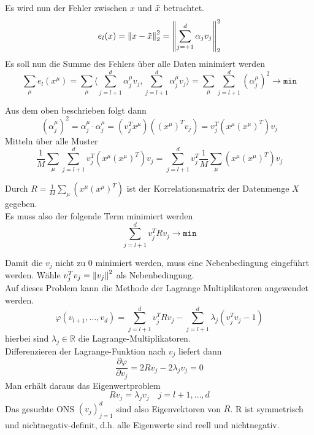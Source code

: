 Es wird nun der Fehler zwischen $x$ und $\Tilde{x}$ betrachtet.
\begin{equation*}
    e_l(x)=\left\lVert x-\Tilde{x}\right\rVert_2^2 = \left\lVert\sum_{j=+1}^d\alpha_jv_j\right\rVert_2^2
\end{equation*}
Es soll nun die Summe des Fehlers über alle Daten minimiert werden
\begin{equation*}
    \sum_\mu e_l(x^\mu) = \sum_\mu \langle \sum_{j=l+1}^d\alpha_j^\mu v_j, \sum_{j=l+1}^d\alpha_j^\mu v_j \rangle = \sum_\mu \sum_{j=l+1}^d(\alpha_j^\mu)^2 \rightarrow \texttt{min}
\end{equation*}

Aus dem oben beschrieben folgt dann
\begin{equation*}
    (\alpha_j^\mu)^2 = \alpha_j^\mu \cdot \alpha_j^\mu = (v_j^Tx^\mu)((x^\mu)^Tv_j) = v_j^T(x^\mu(x^\mu)^T)v_j
\end{equation*}
Mitteln über alle Muster
\begin{equation*}
    \frac{1}{M}\sum_\mu\sum_{j=l+1}^dv_j^T(x^\mu(x^\mu)^T)v_j = \sum_{j=l+1}^dv_j^T\frac{1}{M}\sum_\mu(x^\mu(x^\mu)^T)v_j
\end{equation*}

Durch $R=\frac{1}{M}\sum_\mu(x^\mu(x^\mu)^T)$ ist der Korrelationsmatrix der Datenmenge $X$ gegeben.\\
Es muss also der folgende Term minimiert werden
\begin{equation*}
    \sum_{j=l+1}^dv_j^TRv_j \rightarrow \texttt{min}
\end{equation*}

Damit die $v_j$ nicht zu 0 minimiert werden, muss eine Nebenbedingung eingeführt werden. Wähle $v_j^Tv_j = \left\lVert v_j\right\rVert^2$ als Nebenbedingung.\\
Auf dieses Problem kann die Methode der Lagrange Multiplikatoren angewendet werden.
\begin{equation*}
    \varphi(v_{l+1},\dots,v_d) = \sum_{j=l+1}^dv_j^TRv_j - \sum_{j=l+1}^d\lambda_j(v_j^Tv_j-1)
\end{equation*}
hierbei sind $\lambda_j\in\mathbb{R}$ die Lagrange-Multiplikatoren.\\
Differenzieren der Lagrange-Funktion nach $v_j$ liefert dann 
\begin{equation*}
    \frac{\partial\varphi}{\partial v_j} = 2Rv_j-2\lambda_j v_j=0
\end{equation*}
Man erhält daraus das Eigenwertproblem
\begin{equation*}
    Rv_j = \lambda_jv_j \quad j=l+1,\dots,d
\end{equation*}
Das gesuchte ONS $(v_j)_{j=1}^d$ sind also Eigenvektoren von $R$. R ist symmetrisch und nichtnegativ-definit, d.h. alle Eigenwerte sind reell und nichtnegativ.

